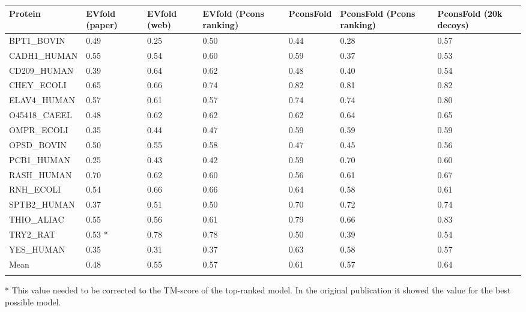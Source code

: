\documentclass{bioinfo}
\begin{document}
\begin{table}[!t]
{\begin{tabular}{lllllll}\toprule
Protein & EVfold (paper) & EVfold (web) & EVfold (Pcons ranking) & PconsFold & PconsFold (Pcons ranking) & PconsFold (20k decoys)\\\midrule
BPT1\_BOVIN & 0.49 & 0.25 & 0.50 & 0.44 & 0.28 & 0.57 \\
CADH1\_HUMAN & 0.55 & 0.54 & 0.60 & 0.59 & 0.37 & 0.53 \\
CD209\_HUMAN & 0.39 & 0.64 & 0.62 & 0.48 & 0.40 & 0.54 \\
CHEY\_ECOLI & 0.65 & 0.66 & 0.74 & 0.82 &  0.81 & 0.82 \\
ELAV4\_HUMAN & 0.57 & 0.61 & 0.57 & 0.74 & 0.74 & 0.80 \\
O45418\_CAEEL & 0.48 & 0.62 & 0.62 & 0.62 & 0.64 & 0.65 \\
OMPR\_ECOLI & 0.35 & 0.44 & 0.47 & 0.59 & 0.59 & 0.59 \\
OPSD\_BOVIN & 0.50 & 0.55 & 0.58 & 0.47 & 0.45 & 0.56 \\
PCB1\_HUMAN & 0.25 & 0.43 & 0.42 & 0.59 & 0.70 & 0.60 \\
RASH\_HUMAN & 0.70 & 0.62 & 0.60 & 0.56 & 0.61& 0.67 \\
RNH\_ECOLI & 0.54 & 0.66 & 0.66 & 0.64 & 0.58& 0.61 \\
SPTB2\_HUMAN & 0.37 & 0.51 & 0.50 & 0.70 & 0.72& 0.74 \\
THIO\_ALIAC & 0.55 & 0.56 & 0.61 & 0.79 & 0.66& 0.83 \\
TRY2\_RAT & 0.53 * & 0.78 & 0.78 & 0.50 & 0.39 & 0.54 \\
YES\_HUMAN & 0.35 & 0.31 & 0.37 & 0.63 & 0.58& 0.57 \\ \midrule
Mean & 0.48 & 0.55 & 0.57 & 0.61 & 0.57& 0.64 \\ \botrule
\end{tabular}}{* This value needed to be corrected to the TM-score of the top-ranked model. In the original publication it showed the value for the best possible model.}
\end{table}
\end{document}
